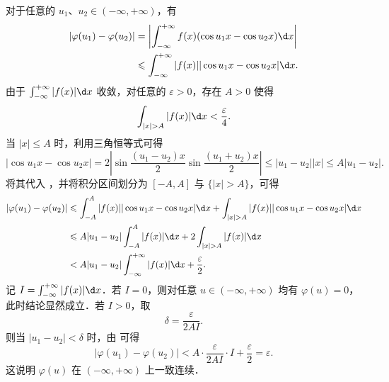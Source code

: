 \begin{myproof}
    对于任意的 $u_1$、$u_2 \in (-\infty, +\infty)$，有
    \begin{equation}\label{eq:q9-diff-2}
        \begin{aligned}
            |\varphi(u_1) - \varphi(u_2)|
             & = \left| \int_{-\infty}^{+\infty} f(x) (\cos u_1 x - \cos u_2 x) \d x \right| \\
             & \leqslant \int_{-\infty}^{+\infty} |f(x)| |\cos u_1 x - \cos u_2 x| \d x.
        \end{aligned}
    \end{equation}
    由于 $\int_{-\infty}^{+\infty} |f(x)| \d x$ 收敛，对任意的 $\varepsilon > 0$，存在 $A > 0$ 使得
    \begin{equation}\label{eq:q9-tail-3}
        \int_{|x| > A} |f(x)| \d x < \frac{\varepsilon}{4}.
    \end{equation}
    当 $|x| \leqslant A$ 时，利用三角恒等式可得
    \begin{equation}\label{eq:q9-cos-diff-4}
        |\cos u_1 x - \cos u_2 x| = 2 \left| \sin \frac{(u_1 - u_2)x}{2} \sin \frac{(u_1 + u_2)x}{2} \right| \leqslant |u_1 - u_2| |x| \leqslant A |u_1 - u_2|.
    \end{equation}
    将其代入 ，并将积分区间划分为 $[-A, A]$ 与 $\{|x| > A\}$，可得
    \begin{equation}\label{eq:q9-three-parts-5}
        \begin{aligned}
            |\varphi(u_1) - \varphi(u_2)|
             & \leqslant \int_{-A}^A |f(x)| |\cos u_1 x - \cos u_2 x| \d x + \int_{|x| > A} |f(x)| |\cos u_1 x - \cos u_2 x| \d x \\
             & \leqslant A |u_1 - u_2| \int_{-A}^A |f(x)| \d x + 2 \int_{|x| > A} |f(x)| \d x                                     \\
             & < A |u_1 - u_2| \int_{-\infty}^{+\infty} |f(x)| \d x + \frac{\varepsilon}{2}.
        \end{aligned}
    \end{equation}
    记 $I = \int_{-\infty}^{+\infty} |f(x)| \d x$．若 $I = 0$，则对任意 $u \in (-\infty, +\infty)$ 均有 $\varphi(u) = 0$，此时结论显然成立．若 $I > 0$，取
    \begin{equation}\label{eq:q9-delta-6}
        \delta = \frac{\varepsilon}{2 A I}.
    \end{equation}
    则当 $|u_1 - u_2| < \delta$ 时，由  可得
    \begin{equation}\label{eq:q9-final-7}
        |\varphi(u_1) - \varphi(u_2)| < A \cdot \frac{\varepsilon}{2 A I} \cdot I + \frac{\varepsilon}{2} = \varepsilon.
    \end{equation}
    这说明 $\varphi(u)$ 在 $(-\infty, +\infty)$ 上一致连续．
\end{myproof}

